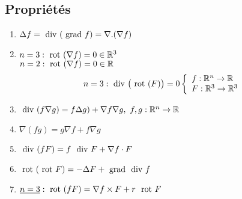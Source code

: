 \documentclass[12pt,a4paper]{article}
\begin{document}
\subsection{Propriétés}
\begin{boite}
\begin{enumerate}
	\item	$\Delta f = \text{ div } (\text{ grad } f) = \nabla. (\nabla f)$
			
		\item 	$n= 3 : \text{ rot }(\nabla f) = 0 \in \mathbb{R}^3$\\
				$n = 2 : \text{ rot }(\nabla f) = 0 \in \mathbb{R}$
				\begin{align*}
					n= 3 : \text{ div }\big(\text{ rot }(F)\big) = 0 
					\left\{
						\begin{array}{l}
							f : \mathbb{R}^n \to \mathbb{R}\\
							F : \mathbb{R}^3 \to \mathbb{R}^3
						\end{array}
					\right.
				\end{align*}
		\item	$\text{ div }(f\nabla g) = f\Delta g) + \nabla f\nabla g,\ f,g : \mathbb{R}^n \to \mathbb{R}$
		\item	$\nabla (fg) = g\nabla f + f\nabla g$
		\item 	$\text{ div }(fF) = f\ \text{ div } F + \nabla f \cdot F$
		\item 	$\text{ rot }(\text{ rot } F) = -\Delta F + \text{ grad } \text{ div } f$
		\item	$\uline{n=3} : \rot(fF) = \nabla f \times F + r\ \rot F$
	\end{enumerate}
\end{boite}
\end{document}
